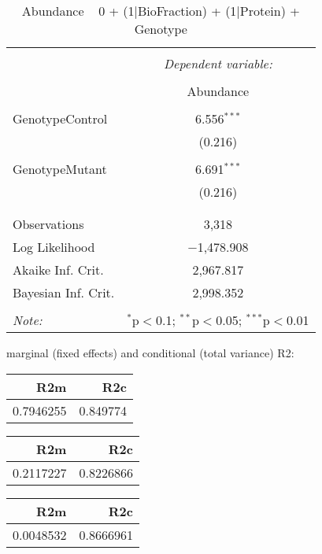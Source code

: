 \documentclass[11pt]{report}
\begin{document}
\begin{table}[!htbp] \centering 
  \caption{Abundance ~ 0 + (1|BioFraction) + (1|Protein) + Genotype} 
  \label{} 
\begin{tabular}{@{\extracolsep{5pt}}lc} 
\\[-1.8ex]\hline 
\hline \\[-1.8ex] 
 & \multicolumn{1}{c}{\textit{Dependent variable:}} \\ 
\cline{2-2} 
\\[-1.8ex] & Abundance \\ 
\hline \\[-1.8ex] 
 GenotypeControl & 6.556$^{***}$ \\ 
  & (0.216) \\ 
  & \\ 
 GenotypeMutant & 6.691$^{***}$ \\ 
  & (0.216) \\ 
  & \\ 
\hline \\[-1.8ex] 
Observations & 3,318 \\ 
Log Likelihood & $-$1,478.908 \\ 
Akaike Inf. Crit. & 2,967.817 \\ 
Bayesian Inf. Crit. & 2,998.352 \\ 
\hline 
\hline \\[-1.8ex] 
\textit{Note:}  & \multicolumn{1}{r}{$^{*}$p$<$0.1; $^{**}$p$<$0.05; $^{***}$p$<$0.01} \\ 
\end{tabular} 
\end{table} 
marginal (fixed effects) and conditional (total variance) R2:

\begin{tabular}{r|r}
\hline
R2m & R2c\\
\hline
0.7946255 & 0.849774\\
\hline
\end{tabular}

\begin{tabular}{r|r}
\hline
R2m & R2c\\
\hline
0.2117227 & 0.8226866\\
\hline
\end{tabular}

\begin{tabular}{r|r}
\hline
R2m & R2c\\
\hline
0.0048532 & 0.8666961\\
\hline
\end{tabular}
\end{document}
